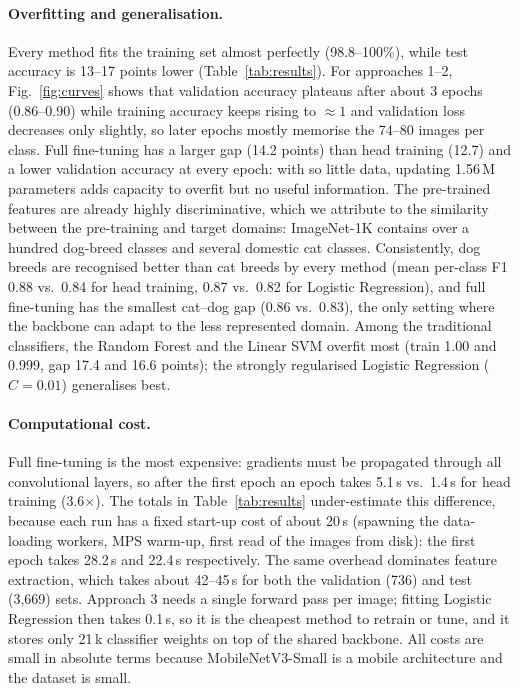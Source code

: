 \documentclass[11pt,a4paper]{article}
\begin{document}
\paragraph{Overfitting and generalisation.} Every method fits the training set almost
perfectly (98.8--100\%), while test accuracy is 13--17 points lower
(Table~\ref{tab:results}). For approaches 1--2, Fig.~\ref{fig:curves} shows that validation
accuracy plateaus after about 3 epochs (0.86--0.90) while training accuracy keeps rising to
${\approx}1$ and validation loss decreases only slightly, so later epochs mostly memorise the 74--80 images
per class. Full fine-tuning has a larger gap (14.2 points) than head training (12.7) and a
lower validation accuracy at every epoch: with so little data, updating 1.56\,M parameters
adds capacity to overfit but no useful information. The pre-trained features are already
highly discriminative, which we attribute to the similarity between the pre-training and target
domains: ImageNet-1K contains over a hundred dog-breed classes and several domestic cat
classes. Consistently, dog breeds are recognised better than cat breeds by every method
(mean per-class F1 0.88 vs.\ 0.84 for head training, 0.87 vs.\ 0.82 for Logistic Regression),
and full fine-tuning has the smallest cat--dog gap (0.86 vs.\ 0.83), the only setting where the
backbone can adapt to the less represented domain. Among the traditional classifiers, the
Random Forest and the Linear SVM overfit most (train 1.00 and 0.999, gap 17.4 and 16.6
points); the strongly regularised Logistic Regression ($C=0.01$) generalises best.

\paragraph{Computational cost.} Full fine-tuning is the most expensive: gradients must be
propagated through all convolutional layers, so after the first epoch an epoch takes 5.1\,s
vs.\ 1.4\,s for head training (3.6$\times$). The totals in Table~\ref{tab:results}
under-estimate this difference, because each run has a fixed start-up cost of about 20\,s
(spawning the data-loading workers, MPS warm-up, first read of the images from disk): the
first epoch takes 28.2\,s and 22.4\,s respectively. The same overhead dominates feature
extraction, which takes about 42--45\,s for both the validation (736) and test (3{,}669)
sets. Approach 3 needs a single forward pass per image; fitting Logistic Regression then
takes 0.1\,s, so it is the cheapest method to retrain or tune, and it stores only 21\,k
classifier weights on top of the shared backbone. All costs are small in absolute terms
because MobileNetV3-Small is a mobile architecture and the dataset is small.
\end{document}
